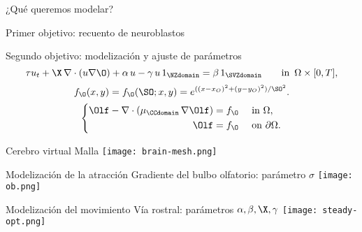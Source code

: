 \begin{frame}{¿Qué queremos modelar?}
\end{frame}

\begin{frame}{Primer objetivo: recuento de neuroblastos}
\end{frame}

\begin{frame}{Segundo objetivo: modelización y ajuste de parámetros}
	\begin{equation}
	\label{eq:neuroblast}
	\tau u_t + \X\, \nabla \cdot(u\nabla \O) + \alpha\, u - \gamma\, u \,1_{\NZdomain} 
	= \beta\, 1_{\SVZdomain}  
	\qquad\text{in}\enspace\Omega\times [0,T],
	\end{equation}
	\vspace{3mm}
	\begin{equation}
	\label{source}
	f_{\O}(x,y) = f_{\O}(\SO; x,y) 
	=  e^{((x-x_O)^2 + (y-y_O)^2)/\SO^2}.
	\end{equation}
	\vspace{3mm}
	\begin{equation} 
	\label{ob}
	\left\{ \begin{aligned} \Olf-\nabla\cdot (\mu_\CCdomain\,\nabla \Olf) &= f_{\O}  \quad  \text{ in } \Omega, \\
	\Olf &= f_{\O}  \quad \text{ on } \partial\Omega.
	\end{aligned}
	\right.
	\end{equation}
\end{frame}

\begin{frame}{Cerebro virtual}
	Malla
	\texttt{[image: brain-mesh.png]}
\end{frame}

\begin{frame}{Modelización de la atracción}
Gradiente del bulbo olfatorio: parámetro $\sigma$
 \texttt{[image: ob.png]}
\end{frame}
\begin{frame}{Modelización del movimiento}
	Vía rostral: parámetros $\alpha, \beta, \X, \gamma$
	\texttt{[image: steady-opt.png]}
\end{frame}




%
%
%


